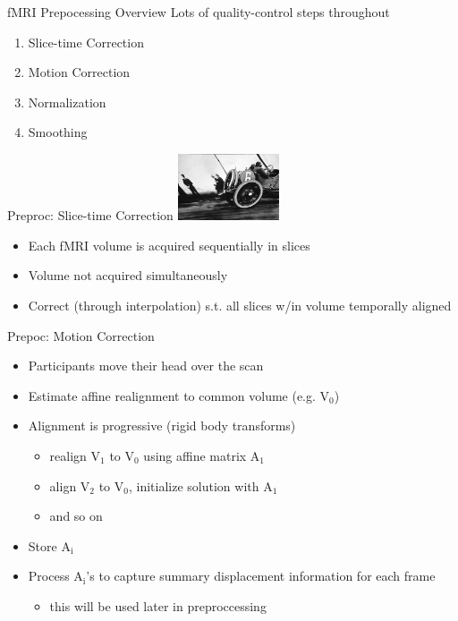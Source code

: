 \documentclass[presentation]{beamer}
\begin{document}
\begin{frame}[label={sec:orgheadline8}]{fMRI Prepocessing Overview}
Lots of quality-control steps throughout
\begin{enumerate}
\item Slice-time Correction
\item Motion Correction
\item Normalization
\item Smoothing
\end{enumerate}
\end{frame}
\begin{frame}[label={sec:orgheadline9}]{Preproc: Slice-time Correction}
\includegraphics[width=3cm]{./rollingshuttercar.jpg}
\begin{itemize}
\item Each fMRI volume is acquired sequentially in slices
\item Volume not acquired simultaneously
\item Correct (through interpolation) s.t. all slices w/in volume temporally aligned
\end{itemize}
\end{frame}
\begin{frame}[label={sec:orgheadline10}]{Prepoc: Motion Correction}
\begin{itemize}
\item Participants move their head over the scan
\item Estimate affine realignment to common volume (e.g. V\(_{\text{0}}\))
\item Alignment is progressive (rigid body transforms)
\begin{itemize}
\item realign V\(_{\text{1}}\) to V\(_{\text{0}}\) using affine matrix A\(_{\text{1}}\)
\item align V\(_{\text{2}}\) to V\(_{\text{0}}\), initialize solution with A\(_{\text{1}}\)
\item and so on
\end{itemize}
\item Store A\(_{\text{i}}\)
\item Process A\(_{\text{i}}\)'s to capture summary displacement information for each frame
\begin{itemize}
\item this will be used later in preproccessing
\end{itemize}
\end{itemize}
\end{frame}
\end{document}
